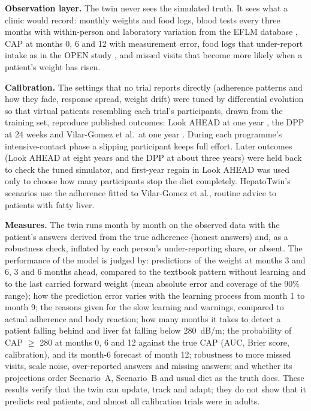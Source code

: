 \textbf{Observation layer.} The twin never sees the simulated truth. It sees
what a clinic would record: monthly weights and food logs, blood tests every
three months with within-person and laboratory variation from the EFLM
database \cite{eflm_bv}, CAP at months 0, 6 and 12 with measurement error,
food logs that under-report intake as in the OPEN study \cite{subar2003open},
and missed visits that become more likely when a patient's weight has risen.

\textbf{Calibration.} The settings that no trial reports directly (adherence
patterns and how they fade, response spread, weight drift) were tuned by
differential evolution so that virtual patients resembling each trial's
participants, drawn from the training set, reproduce published outcomes: Look
AHEAD at one year \cite{lookahead2006intervention}, the DPP at 24 weeks
\cite{dpp2002lifestyle} and Vilar-Gomez et al.\ at one year
\cite{vilargomez2015weight}. During each programme's intensive-contact phase
a slipping participant keeps full effort. Later outcomes (Look AHEAD at eight
years \cite{lookahead2014eightyear} and the DPP at about three years) were held
back to check the tuned simulator, and first-year regain in Look AHEAD
\cite{neiberg2012patterns} was used only to choose how many participants stop
the diet completely. HepatoTwin's scenarios use the adherence fitted to
Vilar-Gomez et al., routine advice to patients with fatty liver.

\textbf{Measures.} The twin runs month by month on the observed data with the
patient's answers derived from the true adherence (honest answers) and, as a
robustness check, inflated by each person's under-reporting share, or absent.
The performance of the model is judged by: predictions of the weight at months 3 
and 6, 3 and 6 months ahead, compared to the textbook pattern without learning 
and to the last carried forward weight (mean absolute error and coverage of the 
90\% range); how the prediction error varies with the learning process from month 
1 to month 9; the reasons given for the slow learning and warnings, compared to actual 
adherence and body reaction; how many months it takes to detect a patient falling
behind and liver fat falling below 280~dB/m; the probability of CAP $\geq$
280 at months 0, 6 and 12 against the true CAP (AUC, Brier score,
calibration), and its month-6 forecast of month 12; robustness to more missed
visits, scale noise, over-reported answers and missing answers; and whether
its projections order Scenario~A, Scenario~B and usual diet as the truth does.
These results verify that the twin can update, track and adapt; they do not
show that it predicts real patients, and almost all calibration trials were in
adults.
